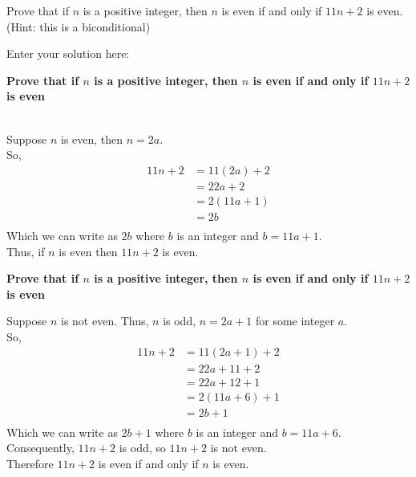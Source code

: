 \documentclass[10pt]{exam}
\begin{document}
\begin{questions}
\question[10] Prove that if $n$ is a positive integer, then $n$ is even if and only if $11n+2$ is even. (Hint: this is a biconditional)

\begin{solution}
Enter your solution here: \\
    \begin{center}
    \textbf{Prove that if $n$ is a positive integer, then $n$ is even if and only if $11n+2$ is even}
    \end{center}
     \\
    Suppose $n$ is even, then $n = 2a$.\\
    So,
    \begin{align*}
    11n + 2 &= 11(2a) + 2\\
    &= 22a + 2\\
    &= 2(11a + 1)\\
    &= 2b\\
    \end{align*}
    Which we can write as $2b$ where $b$ is an integer and $b = 11a + 1$. \\
    Thus, if $n$ is even then $11n+2$ is even.\\
    
    \begin{center}
    \textbf{Prove that if $n$ is a positive integer, then $n$ is even if and only if $11n + 2$ is even}
    \end{center}
    Suppose $n$ is not even. Thus, $n$ is odd, $n = 2a + 1$ for some integer $a$.\\
    So,
    \begin{align*}
    11n + 2 &= 11(2a + 1) + 2\\
    &= 22a + 11 + 2\\
    &= 22a + 12 + 1\\
    &= 2(11a + 6) + 1\\
    &= 2b + 1\\
    \end{align*}
    Which we can write as $2b + 1$ where $b$ is an integer and $b = 11a + 6$. \\
    Consequently, $11n + 2$ is odd, so $11n + 2$ is not even.  \\
    
    Therefore $11n + 2$ is even if and only if $n$ is even.\\
\end{solution}

\end{questions}
\end{document}

